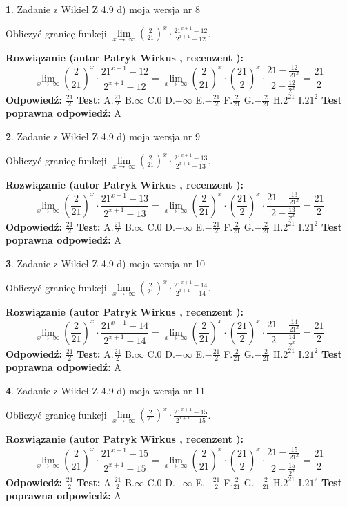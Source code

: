 \documentclass[12pt, a4paper]{article}
\theoremstyle{definition} %
\newtheorem{zad}{}
\newcommand{\zadStart}[1]{\begin{zad}#1\newline}
\newcommand{\zadStop}{\end{zad}}
\newcommand{\rozwStart}[2]{\noindent \textbf{Rozwiązanie (autor #1 , recenzent #2): }\newline}
\newcommand{\rozwStop}{\newline}
\newcommand{\odpStart}{\noindent \textbf{Odpowiedź:}\newline}
\newcommand{\odpStop}{\newline}
\newcommand{\testStart}{\noindent \textbf{Test:}\newline}
\newcommand{\testStop}{\newline}
\newcommand{\kluczStart}{\noindent \textbf{Test poprawna odpowiedź:}\newline}
\newcommand{\kluczStop}{\newline}
\begin{document}
\zadStart{Zadanie z Wikieł Z 4.9 d) moja wersja nr 8}


Obliczyć granicę funkcji  $\lim\limits_{x\to\ \infty}(\frac{2}{21})^{x}\cdot\frac{21^{x+1}-12}{2^{x+1}-12}$.
\zadStop
\rozwStart{Patryk Wirkus}{}
$$\lim\limits_{x\to\ \infty}(\frac{2}{21})^{x}\cdot\frac{21^{x+1}-12}{2^{x+1}-12}=\lim\limits_{x\to\ \infty}(\frac{2}{21})^{x}\cdot(\frac{21}{2})^{x} \cdot \frac{21-\frac{12}{21^{x}}}{2-\frac{12}{2^{x}}} = \frac{21}{2}$$
\rozwStop
\odpStart
$\frac{21}{2}$
\odpStop
\testStart
A.$\frac{21}{2}$ B.$\infty$ C.$0$ D.$-\infty$ E.$-\frac{21}{2}$
F.$\frac{2}{21}$ G.$-\frac{2}{21}$
H.$2^{21}$
I.$21^{2}$
\testStop
\kluczStart
A
\kluczStop



\zadStart{Zadanie z Wikieł Z 4.9 d) moja wersja nr 9}


Obliczyć granicę funkcji  $\lim\limits_{x\to\ \infty}(\frac{2}{21})^{x}\cdot\frac{21^{x+1}-13}{2^{x+1}-13}$.
\zadStop
\rozwStart{Patryk Wirkus}{}
$$\lim\limits_{x\to\ \infty}(\frac{2}{21})^{x}\cdot\frac{21^{x+1}-13}{2^{x+1}-13}=\lim\limits_{x\to\ \infty}(\frac{2}{21})^{x}\cdot(\frac{21}{2})^{x} \cdot \frac{21-\frac{13}{21^{x}}}{2-\frac{13}{2^{x}}} = \frac{21}{2}$$
\rozwStop
\odpStart
$\frac{21}{2}$
\odpStop
\testStart
A.$\frac{21}{2}$ B.$\infty$ C.$0$ D.$-\infty$ E.$-\frac{21}{2}$
F.$\frac{2}{21}$ G.$-\frac{2}{21}$
H.$2^{21}$
I.$21^{2}$
\testStop
\kluczStart
A
\kluczStop



\zadStart{Zadanie z Wikieł Z 4.9 d) moja wersja nr 10}


Obliczyć granicę funkcji  $\lim\limits_{x\to\ \infty}(\frac{2}{21})^{x}\cdot\frac{21^{x+1}-14}{2^{x+1}-14}$.
\zadStop
\rozwStart{Patryk Wirkus}{}
$$\lim\limits_{x\to\ \infty}(\frac{2}{21})^{x}\cdot\frac{21^{x+1}-14}{2^{x+1}-14}=\lim\limits_{x\to\ \infty}(\frac{2}{21})^{x}\cdot(\frac{21}{2})^{x} \cdot \frac{21-\frac{14}{21^{x}}}{2-\frac{14}{2^{x}}} = \frac{21}{2}$$
\rozwStop
\odpStart
$\frac{21}{2}$
\odpStop
\testStart
A.$\frac{21}{2}$ B.$\infty$ C.$0$ D.$-\infty$ E.$-\frac{21}{2}$
F.$\frac{2}{21}$ G.$-\frac{2}{21}$
H.$2^{21}$
I.$21^{2}$
\testStop
\kluczStart
A
\kluczStop



\zadStart{Zadanie z Wikieł Z 4.9 d) moja wersja nr 11}


Obliczyć granicę funkcji  $\lim\limits_{x\to\ \infty}(\frac{2}{21})^{x}\cdot\frac{21^{x+1}-15}{2^{x+1}-15}$.
\zadStop
\rozwStart{Patryk Wirkus}{}
$$\lim\limits_{x\to\ \infty}(\frac{2}{21})^{x}\cdot\frac{21^{x+1}-15}{2^{x+1}-15}=\lim\limits_{x\to\ \infty}(\frac{2}{21})^{x}\cdot(\frac{21}{2})^{x} \cdot \frac{21-\frac{15}{21^{x}}}{2-\frac{15}{2^{x}}} = \frac{21}{2}$$
\rozwStop
\odpStart
$\frac{21}{2}$
\odpStop
\testStart
A.$\frac{21}{2}$ B.$\infty$ C.$0$ D.$-\infty$ E.$-\frac{21}{2}$
F.$\frac{2}{21}$ G.$-\frac{2}{21}$
H.$2^{21}$
I.$21^{2}$
\testStop
\kluczStart
A
\kluczStop
\end{document}
